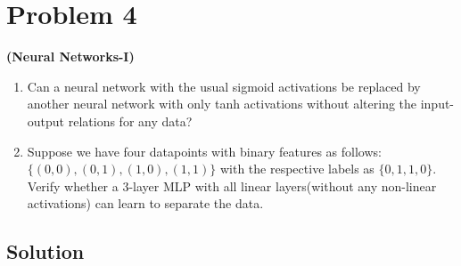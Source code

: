 \section*{Problem 4}

\textbf{(Neural Networks-I)}\\
\begin{enumerate}[label= (\alph*), noitemsep, topsep=0pt]
    \item Can a neural network with the usual sigmoid activations be replaced by another neural network with only tanh activations without altering the input-output relations for any data?

    \item Suppose we have four datapoints with binary features as follows:\\
          \( \{(0,0),(0,1),(1,0),(1,1)\} \) with the respective labels as \( \{0,1,1,0\} \).
          Verify whether a 3-layer MLP with all linear layers(without any non-linear activations) can learn to separate the data.
\end{enumerate}

\subsection*{Solution}
